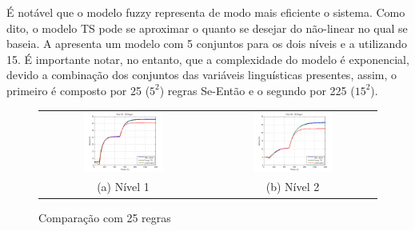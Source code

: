 É notável que o modelo fuzzy representa de modo mais eficiente o sistema. Como dito, o modelo TS pode se aproximar o quanto se desejar do não-linear no qual se baseia. A  apresenta um modelo com 5 conjuntos para os dois níveis e a  utilizando 15. É importante notar, no entanto, que a complexidade do modelo é exponencial, devido a combinação dos conjuntos das variáveis linguísticas presentes, assim, o primeiro é composto por 25 ($5^2$) regras Se-Então e o segundo por 225 ($15^2$).

\begin{figure}[H]
	\centering
	\begin{tabular}{cc}
		\includegraphics[width=0.5\textwidth,keepaspectratio]{img/h1_ts5.png} &
		\includegraphics[width=0.5\textwidth,keepaspectratio]{img/h2_ts5.png} \\
		(a) Nível 1 &
		(b) Nível 2
	\end{tabular}
	\caption{\label{imgTS5} Comparação com 25 regras}
\end{figure}

